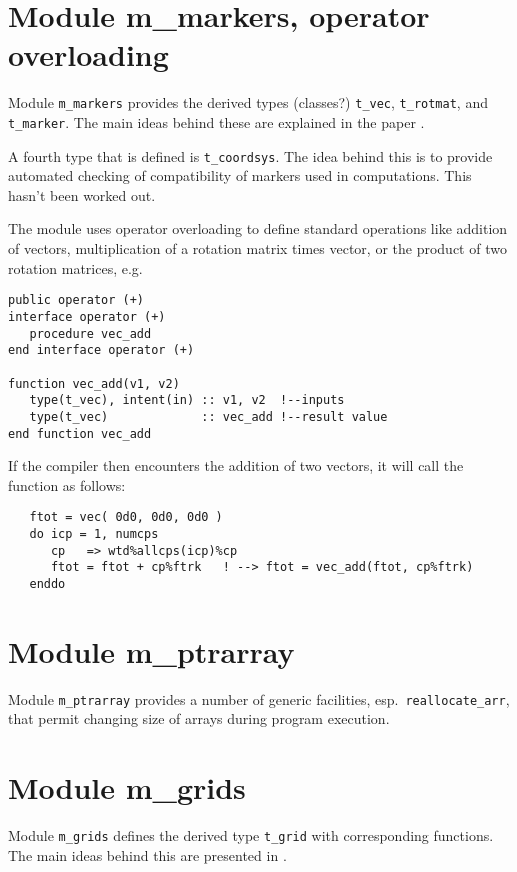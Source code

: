 \documentclass[12pt]{report}
\begin{document}
\section{Module m\_markers, operator overloading}
\label{sec:m_markers}

Module {\tt m\_markers} provides the derived types (classes?) {\tt t\_vec},
{\tt t\_rotmat}, and {\tt t\_marker}. The main ideas behind these are
explained in the paper \cite{Vollebregt2020b-wrgeom}. 

A fourth type that is defined is {\tt t\_coordsys}. The idea behind this is
to provide automated checking of compatibility of markers used in
computations. This hasn't been worked out.

The module uses operator overloading to define standard operations like
addition of vectors, multiplication of a rotation matrix times vector, or
the product of two rotation matrices, e.g.
{\small\begin{verbatim}
public operator (+)
interface operator (+)
   procedure vec_add
end interface operator (+)

function vec_add(v1, v2)
   type(t_vec), intent(in) :: v1, v2  !--inputs
   type(t_vec)             :: vec_add !--result value
end function vec_add
\end{verbatim}}
If the compiler then encounters the addition of two vectors, it will call
the function as follows:
{\small\begin{verbatim}
   ftot = vec( 0d0, 0d0, 0d0 )
   do icp = 1, numcps
      cp   => wtd%allcps(icp)%cp
      ftot = ftot + cp%ftrk   ! --> ftot = vec_add(ftot, cp%ftrk)
   enddo
\end{verbatim}}

\section{Module m\_ptrarray}

Module {\tt m\_ptrarray} provides a number of generic facilities,
esp.\ {\tt reallocate\_arr}, that permit changing size of arrays during
program execution.

\section{Module m\_grids}

Module {\tt m\_grids} defines the derived type {\tt t\_grid} with
corresponding functions. The main ideas behind this are presented in
\cite{Vollebregt2020b-wrgeom}.
\end{document}
